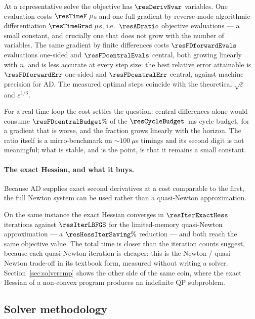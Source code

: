 \documentclass[11pt,a4paper]{article}
\begin{document}

At a representative solve the objective has $\resDerivNvar$ variables. One evaluation costs
$\resTimeF~\mu$s and one full gradient by reverse-mode algorithmic differentiation $\resTimeGrad~\mu$s,
i.e.\ $\resADratio$ objective evaluations --- a small constant, and crucially one that does not grow with the
number of variables. The same gradient by finite differences costs $\resFDforwardEvals$ evaluations one-sided
and $\resFDcentralEvals$ central, both growing linearly with $n$, and is less accurate at every step size:
the best relative error attainable is $\resFDforwardErr$ one-sided and $\resFDcentralErr$ central, against
machine precision for AD. The measured optimal steps coincide with the theoretical $\sqrt{\varepsilon}$ and
$\varepsilon^{1/3}$.

For a real-time loop the cost settles the question: central differences alone would consume
$\resFDcentralBudget\%$ of the $\resCycleBudget$~ms cycle budget, for a gradient that is worse, and the
fraction grows linearly with the horizon. The ratio itself is a micro-benchmark on
$\sim\!100~\mu$s timings and its second digit is not meaningful; what is stable, and is the point, is that it
remains a small constant.

\paragraph{The exact Hessian, and what it buys.} Because AD supplies exact second derivatives at a cost
comparable to the first, the full Newton system can be used rather than a quasi-Newton approximation.


On the same instance the exact Hessian converges in $\resIterExactHess$ iterations against $\resIterLBFGS$
for the limited-memory quasi-Newton approximation --- a $\resHessIterSaving\%$ reduction --- and both reach
the same objective value. The total time is closer than the iteration counts suggest, because each
quasi-Newton iteration is cheaper: this is the Newton / quasi-Newton trade-off in its textbook form,
measured without writing a solver. Section~\ref{sec:solvercmp} shows the other side of the same coin, where
the exact Hessian of a non-convex program produces an indefinite QP subproblem.

\subsection{Solver methodology}
\label{sec:solver}
\end{document}
